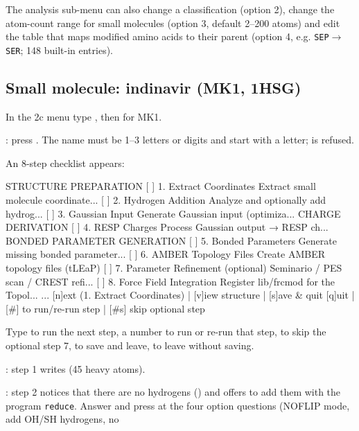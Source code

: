 The analysis sub-menu can also change a classification (option 2), change the
atom-count range for small molecules (option 3, default 2--200 atoms) and edit
the table that maps modified amino acids to their parent (option 4, e.g.
\texttt{SEP}$\to$\texttt{SER}; 148 built-in entries).

\subsection{Small molecule: indinavir (MK1, 1HSG)}
\label{sec:forcefields-small}

\begin{steps}
  \item In the 2c menu type , then  for MK1.
  \item {}: press . The name must
        be 1--3 letters or digits and start with a letter;  is
        refused.
  \item An 8-step checklist appears:
\begin{screen}
  STRUCTURE PREPARATION
  [ ]  1.  Extract Coordinates              Extract small molecule coordinate...
  [ ]  2.  Hydrogen Addition                Analyze and optionally add hydrog...
  [ ]  3.  Gaussian Input                   Generate Gaussian input (optimiza...
  CHARGE DERIVATION
  [ ]  4.  RESP Charges                     Process Gaussian output → RESP ch...
  BONDED PARAMETER GENERATION
  [ ]  5.  Bonded Parameters                Generate missing bonded parameter...
  [ ]  6.  AMBER Topology Files             Create AMBER topology files (tLEaP)
  [ ]  7.  Parameter Refinement (optional)  Seminario / PES scan / CREST refi...
  [ ]  8.  Force Field Integration          Register lib/frcmod for the Topol...
...
  [n]ext (1. Extract Coordinates)  |  [v]iew structure  |  [s]ave & quit
  [q]uit  |  [#] to run/re-run step  |  [#s] skip optional step
\end{screen}
        Type  to run the next step, a number to run or re-run that
        step,  to skip the optional step 7,  to save and
        leave,  to leave without saving.
  \item {}: step 1 writes  (45 heavy atoms).
  \item {}: step 2 notices that there are no hydrogens
        () and offers to add them
        with the program \texttt{reduce}. Answer  and press 
        at the four option questions (NOFLIP mode, add OH/SH hydrogens, no

\end{steps}
